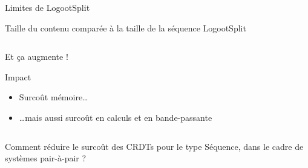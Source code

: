 \begin{frame}{Limites de LogootSplit}
\begin{block}{Taille du contenu comparée à la taille de la séquence LogootSplit}
\begin{columns}
\begin{column}{0.4\textwidth}
\begin{center}
                    \alert{Et ça augmente !}
                \end{center}
                \pause
                \begin{block}{Impact}
                    \begin{itemize}
                        \item Surcoût \alert{mémoire}\dots
                        \item \dots mais aussi surcoût en \alert{calculs} et en \alert{bande-passante}
                    \end{itemize}
                \end{block}
            \end{column}
        \end{columns}
    \end{block}
\end{frame}

\begin{frame}[standout]
    Comment \alert{réduire le surcoût des CRDTs pour le type Séquence}, dans le cadre de \alert{systèmes pair-à-pair} ?
\end{frame}





